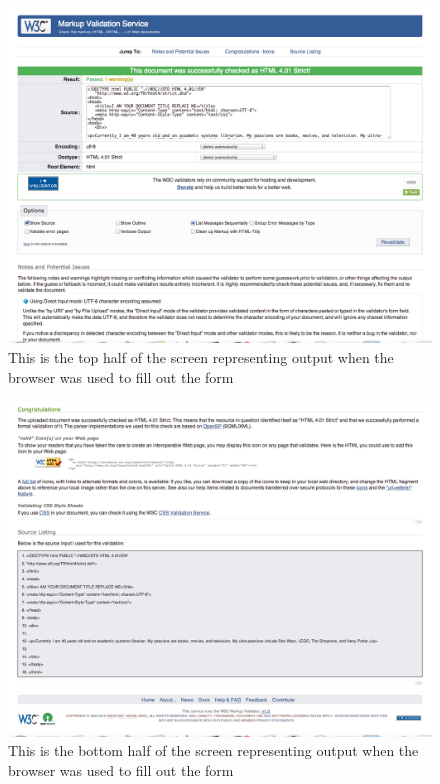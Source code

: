 \documentclass{article}
\begin{document}
\begin{figure}[H]
\includegraphics[scale=0.30]{w3cMarkupValidationServiceNormal01}
\caption{This is the top half of the screen representing output when the browser was used to fill out the form}
\end{figure}

\begin{figure}[H]
\includegraphics[scale=0.30]{w3cMarkupValidationServiceNormal02}
\caption{This is the bottom half of the screen representing output when the browser was used to fill out the form}
\end{figure}
\end{document}
